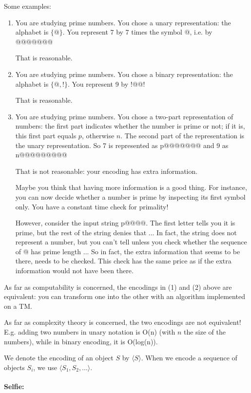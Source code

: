 Some examples:
\begin{enumerate}
\item
You are studying prime numbers. You chose a unary representation: the
alphabet is $\{@\}$. You represent 7 by 7 times the symbol @, i.e. by
@@@@@@@

That is reasonable.

\item
You are studying prime numbers. You chose a binary representation: the
alphabet is $\{@,!\}$. You represent 9 by !@@!

That is reasonable.


\item
You are studying prime numbers. You chose a two-part representation of
numbers: the first part indicates whether the number is prime or not;
if it is, this first part equals $p$, otherwise $n$. The second part
of the representation is the unary representation. So 7 is
represented as p@@@@@@@ and 9 as n@@@@@@@@@

That is not reasonable: your encoding has extra information.

Maybe you think that having more information is a good thing. For instance,
you can now decide whether a number is prime by inspecting its first
symbol only. You have a constant time check for primality!

However, consider the input string p@@@@. The first letter tells you
it is prime, but the rest of the string denies that ... In fact, the
string does not represent a number, but you can't tell unless you
check whether the sequence of @ has prime length ... So in fact, the
extra information that seems to be there, needs to be checked. This
check has the same price as if the extra information would not have
been there.

\end{enumerate}


As far as computability is concerned, the encodings in (1) and (2)
above are equivalent: you can transform one into the other with an
algorithm implemented on a TM.

As far as complexity theory is concerned, the two encodings are not
equivalent! E.g. adding two numbers in unary notation is O(n) (with $n$
the size of the numbers), while in binary encoding, it is
O(log(n)).

We denote the encoding of an object $S$ by $\langle S \rangle$. When
we encode a sequence of objects $S_i$, we use $\langle
S_1,S_2,... \rangle$.

\paragraph{Selfie:}

